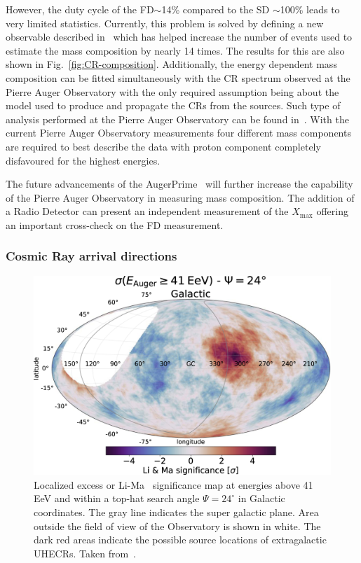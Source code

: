 However, the duty cycle of the \gls{FD}$\sim$14\% compared to the \gls{SD} $\sim$100\% leads to very limited statistics. Currently, this problem is solved by defining a new observable described in~\cite{2017arXiv171007249T} which has helped increase the number of events used to estimate the mass composition by nearly 14 times. The results for this are also shown in Fig.~\ref{fig:CR-composition}. Additionally, the energy dependent mass composition can be fitted simultaneously with the \gls{CR} spectrum observed at the Pierre Auger Observatory with the only required assumption being about the model used to produce and propagate the \glspl{CR} from the sources. Such type of analysis performed at the Pierre Auger Observatory can be found in~\cite{2018_auger_comp_spec}. With the current Pierre Auger Observatory measurements four different mass components are required to best describe the data with proton component completely disfavoured for the highest energies.

The future advancements of the AugerPrime~\cite{ANASTASI2022167497} will further increase the capability of the Pierre Auger Observatory in measuring mass composition. The addition of a Radio Detector can present an independent measurement of the $X_{\text{max}}$ offering an important cross-check on the \gls{FD} measurement. 

\subsubsection*{Cosmic Ray arrival directions}
\label{subsubsec:CRdirec}
\begin{figure}[t!]
  \centering
  \includegraphics[width=14.5cm]{thesis_figures/CRnNu/apjac7d4ef1_hr.jpg}
  \caption{Localized excess or Li-Ma~\cite{Li:1983fv} significance map at energies above 41 EeV and within a top-hat search angle $\Psi = 24^\circ$ in Galactic coordinates. The gray line indicates the super galactic plane. Area outside the field of view of the Observatory is shown in white. The dark red areas indicate the possible source locations of extragalactic \glspl{UHECR}. Taken from~\cite{Abreu_2022}.}
  \label{fig:CR-anisotropy}
\end{figure}

